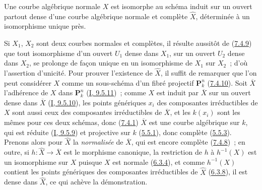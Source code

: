 \begin{corollary}[7.4.11]
\label{II.7.4.11-fr}
Une courbe algébrique normale $X$ est isomorphe au schéma induit sur un ouvert
partout dense d'une courbe algébrique normale et complète $\widehat{X}$,
déterminée à un isomorphisme unique près.
\end{corollary}

Si $X_1$, $X_2$ sont deux courbes normales et complètes, il résulte aussitôt
de (\hyperref[II.7.4.9-fr]{7.4.9}) que tout isomorphisme d'un ouvert $U_1$
dense dans $X_1$, sur un ouvert $U_2$ dense dans $X_2$, se prolonge de façon
unique en un isomorphisme de $X_1$ sur $X_2$~; d'où l'assertion d'unicité. Pour
prouver l'existence de $\widehat{X}$, il suffit de remarquer que l'on peut
considérer $X$ comme un sous-schéma d'un fibré projectif $\mathbf{P}_k^n$
(\hyperref[II.7.4.10-fr]{7.4.10}). Soit $\overline{X}$ l'adhérence de $X$ dans
$\mathbf{P}_k^n$ (\hyperref[I.9.5.11-fr]{I, 9.5.11})~; comme $X$ est induit
par $\overline{X}$ sur un ouvert dense dans $\overline{X}$
(\hyperref[I.9.5.10-fr]{I, 9.5.10}), les points génériques $x_i$ des
composantes irréductibles de $X$ sont aussi ceux des composantes irréductibles
de $\overline{X}$, et les $k(x_i)$ sont les mêmes pour ces deux schémas, donc
(\hyperref[II.7.4.1-fr]{7.4.1}) $\overline{X}$ est une courbe algébrique sur
$k$, qui est réduite (\hyperref[I.9.5.9-fr]{I, 9.5.9}) et projective sur $k$
(\hyperref[II.5.5.1-fr]{5.5.1}), donc complète
(\hyperref[II.5.5.3-fr]{5.5.3}). Prenons alors pour $\widehat{X}$ la
\emph{normalisée} de $\overline{X}$, qui est encore complète
(\hyperref[II.7.4.8-fr]{7.4.8})~; en outre, si
$h:\widehat{X}\to\overline{X}$ est le morphisme canonique, la restriction de
$h$ à $h^{-1}(X)$ est un isomorphisme sur $X$ puisque $X$ est normale
(\hyperref[II.6.3.4-fr]{6.3.4}), et comme $h^{-1}(X)$ contient les points
génériques des composantes irréductibles de $\widehat{X}$
(\hyperref[II.6.3.8-fr]{6.3.8}), il est dense dans $\widehat{X}$, ce qui achève
la démonstration.

